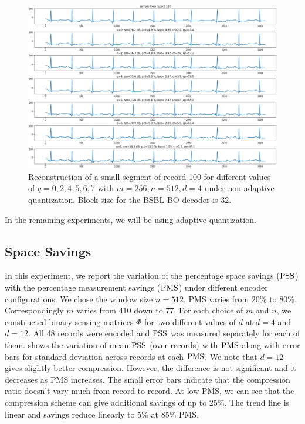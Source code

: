 \begin{figure}
\centering 
\includegraphics[width=0.95\linewidth]
{images/rec_100_q_cr_prd_qs.png}
\caption{Reconstruction of a small segment of record 100
for different values of $q=0,2,4,5,6,7$ with $m=256,n=512,d=4$
under non-adaptive quantization.
Block size for the BSBL-BO decoder is $32$.}
\label{fig:100:q:0-7}
\end{figure}


In the remaining experiments, we will be using adaptive
quantization.


\subsection{Space Savings}

In this experiment, we report the variation of
the percentage space savings ($\mathrm{PSS}$)
with the percentage measurement savings ($\mathrm{PMS}$)
under different encoder configurations.
We chose the window size $n=512$.
PMS varies from $20\%$ to $80\%$.
Correspondingly $m$ varies from $410$ down to $77$.
For each choice of $m$ and $n$, we constructed
binary sensing matrices $\Phi$
for two different values of $d$ at $d=4$ and $d=12$.
All 48 records were encoded and $\mathrm{PSS}$ was measured
separately for each of them.
 shows the variation
of mean $\mathrm{PSS}$ (over records) with $\mathrm{PMS}$ along with
error bars for standard deviation across records
at each $\mathrm{PMS}$.
We note that $d=12$ gives slightly better compression.
However, the difference is not significant and it decreases
as PMS increases. The small error bars indicate that the
compression ratio doesn't vary much from record to record.
At low PMS, we can see that the compression scheme can
give additional savings of up to 25\%. The trend line
is linear and savings reduce linearly to 5\% at 85\% PMS.

